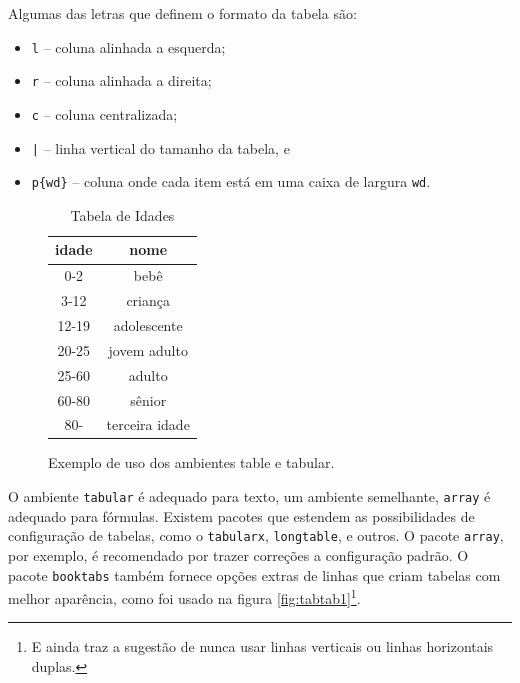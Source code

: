 Algumas das letras que definem o formato da tabela são:
\begin{itemize}
    \item \lstinline|l| -- coluna alinhada a esquerda;
    \item \lstinline|r| -- coluna alinhada a direita;
    \item \lstinline|c| -- coluna centralizada;
    \item \lstinline/|/ -- linha vertical do tamanho da tabela, e
    \item \lstinline|p{wd}| -- coluna onde cada item está em uma caixa de largura \lstinline|wd|.
\end{itemize}

\begin{figure}
    \begin{LTXexample}[pos=b]
    \begin{table}
    \caption{Tabela de Idades}
    \centering
    \label{tab:idades}
    \begin{tabular}{|c|c|}
    \hline
    \textbf{idade} & \textbf{nome} \\
    \hline
    0-2   & bebê \\
    3-12  & criança \\
    12-19 & adolescente \\
    20-25 & jovem adulto \\
    25-60 & adulto \\
    60-80 & sênior \\
    80-   & terceira idade \\
    \hline
    \end{tabular}
    \end{table}
    \end{LTXexample}
    \caption{Exemplo de uso dos ambientes table e tabular.}
\label{fig:tabtab}
\end{figure}

O ambiente \lstinline|tabular| é adequado para texto, um ambiente semelhante, \lstinline|array| é adequado para fórmulas. 
Existem pacotes que estendem as possibilidades de configuração de tabelas, como o \lstinline|tabularx|\parencite{Carlisle:2020}, \lstinline|longtable|\parencite{Carlisle:2020a}, e outros. O pacote \lstinline|array|\parencite{Mittelbach:2020}, por exemplo, é recomendado por trazer correções a configuração padrão. O pacote \lstinline|booktabs|\parencite{Fear:2020} também fornece opções extras de linhas que criam tabelas com melhor aparência, como foi usado na figura \ref{fig:tabtab1}\footnote{E ainda traz a sugestão de nunca usar linhas verticais ou linhas horizontais duplas.}.


